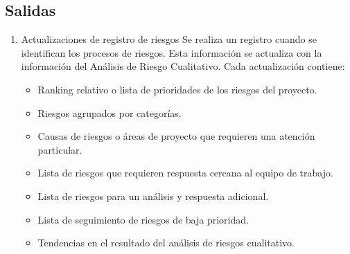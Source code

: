 \subsection{Salidas}
\begin{enumerate}
	\item Actualizaciones de registro de riesgos
        Se realiza un registro cuando se identifican los procesos de riesgos.
        Esta información se actualiza con la información del Análisis de Riesgo Cualitativo.
        Cada actualización contiene:
		\begin{itemize}
            \item Ranking relativo o lista de prioridades de los riesgos del proyecto.
			\item Riesgos agrupados por categorías.
			\item Causas de riesgos o áreas de proyecto que requieren una atención particular.
			\item Lista de riesgos que requieren respuesta cercana al equipo de trabajo.
			\item Lista de riesgos para un análisis y respuesta adicional.
			\item Lista de seguimiento de riesgos de baja prioridad.
			\item Tendencias en el resultado del análisis  de riesgos cualitativo.
		\end{itemize}
\end{enumerate}

